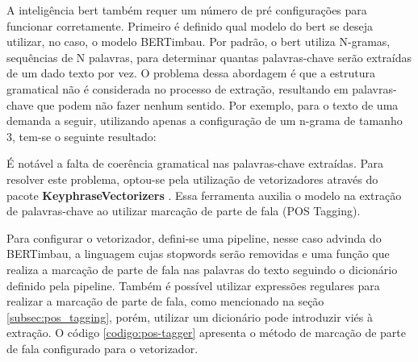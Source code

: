A inteligência \gls{bert} também requer um número de pré configurações para funcionar corretamente. Primeiro é definido qual modelo do \gls{bert} se deseja utilizar, no caso, o modelo BERTimbau. Por padrão, o \gls{bert} utiliza N-gramas, sequências de N palavras, para determinar quantas palavras-chave serão extraídas de um dado texto por vez. O problema dessa abordagem é que a estrutura gramatical não é considerada no processo de extração, resultando em palavras-chave que podem não fazer nenhum sentido. Por exemplo, para o texto de uma demanda a seguir, utilizando apenas a configuração de um n-grama de tamanho 3, tem-se o seguinte resultado:



É notável a falta de coerência gramatical nas palavras-chave extraídas. Para resolver este problema, optou-se pela utilização de vetorizadores através do pacote \textbf{KeyphraseVectorizers} \cite{schopf_etal_kdir22}. Essa ferramenta auxilia o modelo na extração de palavras-chave ao utilizar marcação de parte de fala (POS Tagging).

Para configurar o vetorizador, defini-se uma pipeline, nesse caso advinda do BERTimbau, a linguagem cujas stopwords serão removidas e uma função que realiza a marcação de parte de fala nas palavras do texto seguindo o dicionário definido pela pipeline. Também é possível utilizar expressões regulares para realizar a marcação de parte de fala, como mencionado na seção \ref{subsec:pos_tagging}, porém, utilizar um dicionário pode introduzir viés à extração. O código \ref{codigo:pos-tagger} apresenta o método de marcação de parte de fala configurado para o vetorizador.

